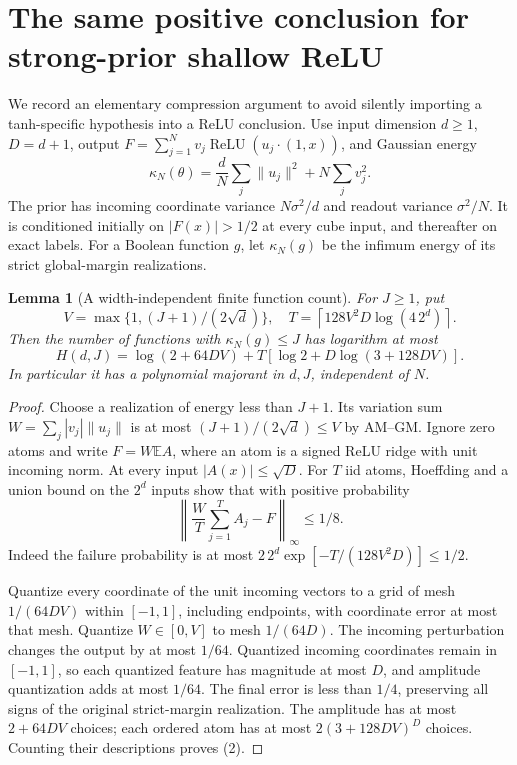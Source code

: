 \documentclass[11pt]{article}
\newtheorem{lemma}[theorem]{Lemma}
\newcommand{\E}{\mathbb E}
\begin{document}
\section{The same positive conclusion for strong-prior shallow ReLU}
We record an elementary compression argument to avoid silently importing
a tanh-specific hypothesis into a ReLU conclusion. Use input dimension
$d\ge1$, $D=d+1$, output $F=\sum_{j=1}^Nv_j\operatorname{ReLU}
(u_j\cdot(1,x))$, and Gaussian energy
\[
 \kappa_N(\theta)=\frac dN\sum_j\|u_j\|^2+N\sum_jv_j^2.
\]
The prior has incoming coordinate variance $N\sigma^2/d$ and readout
variance $\sigma^2/N$. It is conditioned initially on
$|F(x)|>1/2$ at every cube input, and thereafter on exact labels.
For a Boolean function $g$, let $\kappa_N(g)$ be the infimum energy
of its strict global-margin realizations.

\begin{lemma}[A width-independent finite function count]
For $J\ge1$, put
\[
 V=\max\{1,(J+1)/(2\sqrt d)\},\quad
 T=\left\lceil128V^2D\log(4\,2^d)\right\rceil.
\]
Then the number of functions with $\kappa_N(g)\le J$ has logarithm at most
\[
 H(d,J)=\log(2+64DV)+T[\log2+D\log(3+128DV)].              \tag{2}
\]
In particular it has a polynomial majorant in $d,J$, independent of $N$.
\end{lemma}
\begin{proof}
Choose a realization of energy less than $J+1$. Its variation sum
$W=\sum_j|v_j|\|u_j\|$ is at most $(J+1)/(2\sqrt d)\le V$ by AM--GM.
Ignore zero atoms and write $F=W\E A$, where an atom is a signed ReLU
ridge with unit incoming norm. At every input $|A(x)|\le\sqrt D$.
For $T$ iid atoms, Hoeffding and a union bound on the $2^d$ inputs show
that with positive probability
\[
 \left\|\frac WT\sum_{j=1}^TA_j-F\right\|_\infty\le1/8.
\]
Indeed the failure probability is at most
$2\,2^d\exp[-T/(128V^2D)]\le1/2$.

Quantize every coordinate of the unit incoming vectors to a grid of
mesh $1/(64DV)$ within $[-1,1]$, including endpoints, with coordinate
error at most that mesh. Quantize $W\in[0,V]$ to mesh $1/(64D)$.
The incoming perturbation changes the output by at most $1/64$.
Quantized incoming coordinates remain in $[-1,1]$, so each quantized
feature has magnitude at most $D$, and amplitude quantization adds
at most $1/64$. The final error is less than $1/4$, preserving all
signs of the original strict-margin realization. The amplitude has
at most $2+64DV$ choices; each ordered atom has at most
$2(3+128DV)^D$ choices. Counting their descriptions proves (2).
\end{proof}
\end{document}
